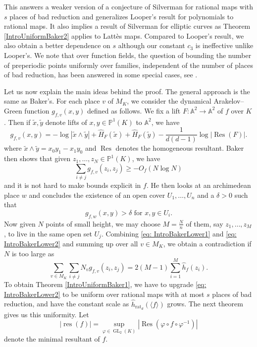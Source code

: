 \documentclass[10pt]{amsart}
\newcommand{\bb}{\mathbb}
\newcommand{\vphi}{\varphi}
\newcommand{\Res}{\operatorname{Res}}
\newcommand{\res}{\operatorname{res}}
\newcommand{\h}{\widehat{h}}
\newcommand{\GL}{\operatorname{GL}}
\newcommand{\rat}{\operatorname{rat}}
\newcommand{\Ht}{\widehat{H}}
\numberwithin{theorem}{section}
\numberwithin{example}{section}
\numberwithin{definition}{section}
\begin{document}
This answers a weaker version of a conjecture of Silverman \cite[Conjecture 4.98]{Sil07} for rational maps with $s$ places of bad reduction and generalizes Looper's result for polynomials \cite{Loo19} to rational maps. It also implies a result of Silverman \cite{Sil81} for elliptic curves as Theorem \ref{IntroUniformBaker2} applies to Lattès maps. Compared to Looper's result, we also obtain a better dependence on $s$ although our constant $c_3$ is ineffective unlike Looper's. We note that over function fields, the question of bounding the number of preperiodic points uniformly over families, independent of the number of places of bad reduction, has been answered in some special cases, see \cite{HS88, DP20, Loo21, DF24}. 
\par 
Let us now explain the main ideas behind the proof. The general approach is the same as Baker's. For each place $v$ of $M_K$, we consider the dynamical Arakelov--Green function $g_{f,v}(x,y)$ defined as follows. We fix a lift $F: \bb{A}^2 \to \bb{A}^2$ of $f$ over $K$. Then if $\tilde{x},\tilde{y}$ denote lifts of $x,y \in \bb{P}^1(K)$ to $\bb{A}^2$, we have
$$g_{f,v}(x,y) = -\log |\tilde{x} \wedge \tilde{y}| + \Ht_F(\tilde{x}) + \Ht_F(\tilde{y}) - \frac{1}{d(d-1)} \log |\Res(F)|.$$
where $\tilde{x} \wedge \tilde{y} = x_0y_1 - x_1y_0$ and $\Res$ denotes the homogeneous resultant. Baker then shows that given $z_1,\ldots,z_N \in \bb{P}^1(K)$, we have 
\begin{equation} \label{eq: IntroBakerLower1}
\sum_{i \not = j} g_{f,v}(z_i,z_j) \geq -O_{f}(N \log N)
\end{equation} 
and it is not hard to make bounds explicit in $f$. He then looks at an archimedean place $w$ and concludes the existence of an open cover $U_1,\ldots,U_n$ and a $\delta > 0$ such that 
\begin{equation} \label{eq: IntroBakerLower2}
g_{f,w}(x,y) > \delta \text{ for } x,y \in U_i.
\end{equation}
Now given $N$ points of small height, we may choose $M = \frac{N}{n}$ of them, say $z_1,\ldots,z_M$, to live in the same open set $U_j$. Combining \eqref{eq: IntroBakerLower1} and \eqref{eq: IntroBakerLower2} and summing up over all $v \in M_K$, we obtain a contradiction if $N$ is too large as 
$$\sum_{v \in M_K} \sum_{i \not = j} N_v g_{f,v}(z_i,z_j) = 2(M-1) \sum_{i=1}^{M} \h_f(z_i).$$
To obtain Theorem \ref{IntroUniformBaker1}, we have to upgrade \eqref{eq: IntroBakerLower2} to be uniform over rational maps with at most $s$ places of bad reduction, and have the constant scale as $\h_{\rat_d}(\langle f \rangle)$ grows. The next theorem gives us this uniformity. Let
$$|\res(f)| = \sup_{\vphi \in \GL_2(K)} |\Res(\vphi \circ f \circ \vphi^{-1})|$$
denote the minimal resultant of $f$. 
\end{document}
